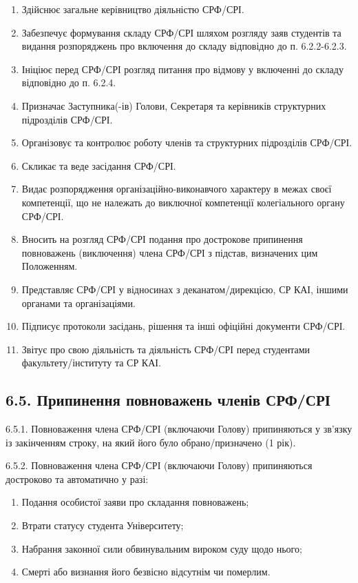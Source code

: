         \begin{enumerate}[label=\alph*)]
            \item Здійснює загальне керівництво діяльністю СРФ/СРІ.
            \item Забезпечує формування складу СРФ/СРІ шляхом розгляду заяв студентів та видання розпоряджень про включення до складу відповідно до п. 6.2.2-6.2.3.
            \item Ініціює перед СРФ/СРІ розгляд питання про відмову у включенні до складу відповідно до п. 6.2.4.
            \item Призначає Заступника(-ів) Голови, Секретаря та керівників структурних підрозділів СРФ/СРІ.
            \item Організовує та контролює роботу членів та структурних підрозділів СРФ/СРІ.
            \item Скликає та веде засідання СРФ/СРІ.
            \item Видає розпорядження організаційно-виконавчого характеру в межах своєї компетенції, що не належать до виключної компетенції колегіального органу СРФ/СРІ.
            \item Вносить на розгляд СРФ/СРІ подання про дострокове припинення повноважень (виключення) члена СРФ/СРІ з підстав, визначених цим Положенням.
            \item Представляє СРФ/СРІ у відносинах з деканатом/дирекцією, СР КАІ, іншими органами та організаціями.
            \item Підписує протоколи засідань, рішення та інші офіційні документи СРФ/СРІ.
            \item Звітує про свою діяльність та діяльність СРФ/СРІ перед студентами факультету/інституту та СР КАІ.
        \end{enumerate}

\subsection*{6.5. Припинення повноважень членів СРФ/СРІ}
    6.5.1. Повноваження члена СРФ/СРІ (включаючи Голову) припиняються у зв'язку із закінченням строку, на який його було обрано/призначено (1 рік).

    6.5.2. Повноваження члена СРФ/СРІ (включаючи Голову) припиняються достроково та автоматично у разі:

        \begin{enumerate}[label=\alph*)]
            \item Подання особистої заяви про складання повноважень;
            \item Втрати статусу студента Університету;
            \item Набрання законної сили обвинувальним вироком суду щодо нього;
            \item Смерті або визнання його безвісно відсутнім чи померлим.
        \end{enumerate}

